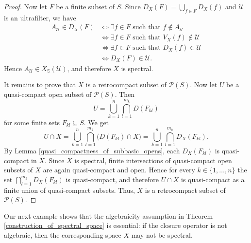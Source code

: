 \documentclass[10pt, reqno]{amsart}
\theoremstyle{plain}
\theoremstyle{definition}
\begin{document}
\begin{proof}
    Now let $F$ be a finite subset of $S$. Since $D_X(F) = \bigcup_{f \in F} D_X(f)$ and $\mathscr{U}$ is an ultrafilter, we have
    \begin{align*} 
        A_\mathscr{U} \in D_X(F) &\iff \exists f \in F \text{ such that } f \not\in A_\mathscr{U} \\ &\iff \exists f \in F \text{ such that } V_X(f) \not\in\mathscr{U} \\ &\iff \exists f \in F \text{ such that } D_X(f) \in \mathscr{U} \\ &\iff  
        D_X(F) \in \mathscr{U}. 
    \end{align*} 
    Hence $A_\mathscr{U}\in X_\mathbb{S}(\mathscr{U})$, and therefore $X$ is spectral.
    
    It remains to prove that $X$ is a retrocompact subset of $\mathcal{P}(S)$. Now let $U$ be a quasi-compact open subset of $\mathcal{P}(S)$. Then $$U = \bigcup_{k = 1}^n \bigcap_{l = 1}^{m_k} D(F_{kl})$$ for some finite sets $F_{kl} \subseteq S$. We get 
    \begin{equation*}
        U \cap X = \bigcup_{k = 1}^n \bigcap_{l = 1}^{m_k} \big(D(F_{kl}) \cap X\big) = \bigcup_{k = 1}^n\bigcap_{l = 1}^{m_k} D_X(F_{kl}). 
    \end{equation*}
    By Lemma \ref{quasi_compactness_of_subbasic_opens}, each $D_X(F_{kl})$ is quasi-compact in $X$. Since $X$ is spectral, finite intersections of quasi-compact open subsets of $X$ are again quasi-compact and open. Hence for every $k \in \{1, \ldots, n\}$ the set $\bigcap_{l = 1}^{m_k} D_X(F_{kl})$ is quasi-compact, and therefore $U \cap X$ is quasi-compact as a finite union of quasi-compact subsets. Thus, $X$ is a retrocompact subset of $\mathcal{P}(S)$. 
\end{proof}
Our next example shows that the algebraicity assumption in Theorem \ref{construction_of_spectral_space} is essential: if the closure operator is not algebraic, then the corresponding space $X$ may not be spectral. 
\end{document}
